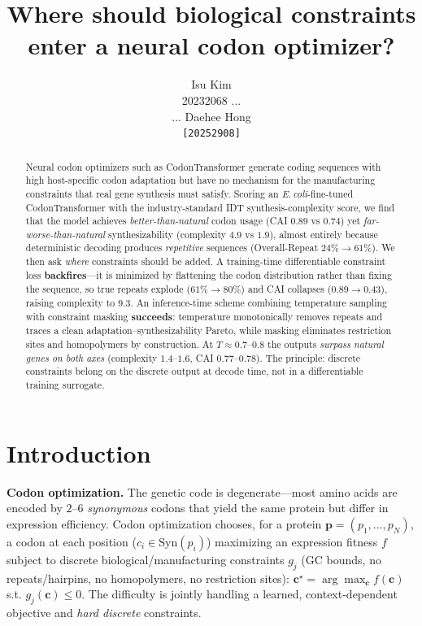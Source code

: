 \documentclass{article}
\title{Where should biological constraints enter a neural codon optimizer?}
\author{%
    Isu Kim \\ 20232068 \And
    ... \\ ... \And
    Daehee Hong \\ \texttt{[20252908]}
}
\begin{document}
\maketitle

\begin{abstract}
Neural codon optimizers such as CodonTransformer generate coding sequences with high host-specific codon adaptation but have no mechanism for the manufacturing constraints that real gene synthesis must satisfy. Scoring an \emph{E.\,coli}-fine-tuned CodonTransformer with the industry-standard IDT synthesis-complexity score, we find that the model achieves \emph{better-than-natural} codon usage (CAI $0.89$ vs $0.74$) yet \emph{far-worse-than-natural} synthesizability (complexity $4.9$ vs $1.9$), almost entirely because deterministic decoding produces \emph{repetitive} sequences (Overall-Repeat $24\%\!\to\!61\%$). We then ask \emph{where} constraints should be added. A training-time differentiable constraint loss \textbf{backfires}---it is minimized by flattening the codon distribution rather than fixing the sequence, so true repeats explode ($61\%\!\to\!80\%$) and CAI collapses ($0.89\!\to\!0.43$), raising complexity to $9.3$. An inference-time scheme combining temperature sampling with constraint masking \textbf{succeeds}: temperature monotonically removes repeats and traces a clean adaptation--synthesizability Pareto, while masking eliminates restriction sites and homopolymers by construction. At $T\!\approx\!0.7$--$0.8$ the outputs \emph{surpass natural genes on both axes} (complexity $1.4$--$1.6$, CAI $0.77$--$0.78$). The principle: discrete constraints belong on the discrete output at decode time, not in a differentiable training surrogate.
\end{abstract}

\section{Introduction}

\textbf{Codon optimization.} The genetic code is degenerate---most amino acids are encoded by $2$--$6$ \emph{synonymous} codons that yield the same protein but differ in expression efficiency. Codon optimization chooses, for a protein $\mathbf{p}=(p_1,\dots,p_N)$, a codon at each position ($c_i\in\mathrm{Syn}(p_i)$) maximizing an expression fitness $f$ subject to discrete biological/manufacturing constraints $g_j$ (GC bounds, no repeats/hairpins, no homopolymers, no restriction sites): $\mathbf{c}^\star=\arg\max_{\mathbf c} f(\mathbf c)$ s.t. $g_j(\mathbf c)\le 0$. The difficulty is jointly handling a learned, context-dependent objective and \emph{hard discrete} constraints.
\end{document}
